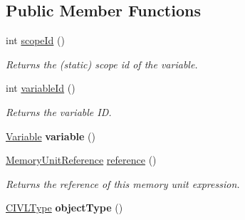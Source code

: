 \subsection*{Public Member Functions}
\begin{DoxyCompactItemize}
\item 
int \hyperlink{interfaceedu_1_1udel_1_1cis_1_1vsl_1_1civl_1_1model_1_1IF_1_1expression_1_1MemoryUnitExpression_ae2458303b5a1cc0d5018610b880f35ed}{scope\+Id} ()
\begin{DoxyCompactList}\small\item\em Returns the (static) scope id of the variable. \end{DoxyCompactList}\item 
int \hyperlink{interfaceedu_1_1udel_1_1cis_1_1vsl_1_1civl_1_1model_1_1IF_1_1expression_1_1MemoryUnitExpression_ae8ada3e83dd23f6519d447c35f756d33}{variable\+Id} ()
\begin{DoxyCompactList}\small\item\em Returns the variable I\+D. \end{DoxyCompactList}\item 
\hypertarget{interfaceedu_1_1udel_1_1cis_1_1vsl_1_1civl_1_1model_1_1IF_1_1expression_1_1MemoryUnitExpression_aa89f05abce40676f955e6be6f8bb956d}{}\hyperlink{interfaceedu_1_1udel_1_1cis_1_1vsl_1_1civl_1_1model_1_1IF_1_1variable_1_1Variable}{Variable} {\bfseries variable} ()\label{interfaceedu_1_1udel_1_1cis_1_1vsl_1_1civl_1_1model_1_1IF_1_1expression_1_1MemoryUnitExpression_aa89f05abce40676f955e6be6f8bb956d}

\item 
\hyperlink{interfaceedu_1_1udel_1_1cis_1_1vsl_1_1civl_1_1model_1_1IF_1_1expression_1_1reference_1_1MemoryUnitReference}{Memory\+Unit\+Reference} \hyperlink{interfaceedu_1_1udel_1_1cis_1_1vsl_1_1civl_1_1model_1_1IF_1_1expression_1_1MemoryUnitExpression_ac33e0d04ac053db86c2ca07560454a63}{reference} ()
\begin{DoxyCompactList}\small\item\em Returns the reference of this memory unit expression. \end{DoxyCompactList}\item 
\hypertarget{interfaceedu_1_1udel_1_1cis_1_1vsl_1_1civl_1_1model_1_1IF_1_1expression_1_1MemoryUnitExpression_acdb248a47fd386342f0483154e2a2902}{}\hyperlink{interfaceedu_1_1udel_1_1cis_1_1vsl_1_1civl_1_1model_1_1IF_1_1type_1_1CIVLType}{C\+I\+V\+L\+Type} {\bfseries object\+Type} ()\label{interfaceedu_1_1udel_1_1cis_1_1vsl_1_1civl_1_1model_1_1IF_1_1expression_1_1MemoryUnitExpression_acdb248a47fd386342f0483154e2a2902}


\end{DoxyCompactItemize}
